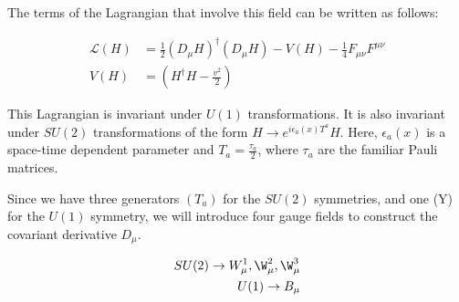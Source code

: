The terms of the Lagrangian that involve this field can be written as follows:

\begin{align*}
  \mathcal{L}(H) &= \frac{1}{2}(D_\mu H)^\dag(D_\mu H)-V(H)-\frac{1}{4}F_{\mu\nu}F^{\mu\nu}\\
  V(H) &= \left(H^\dag H-\frac{v^2}{2}\right)
\end{align*}

This Lagrangian is invariant under $U(1)$ transformations. It is also invariant under $SU(2)$ transformations of the form $H\rightarrow e^{i\epsilon_a(x)T^a}H$. Here, $\epsilon_a (x)$ is a space-time dependent parameter and $T_a = \frac{\tau_a}{2}$, where $\tau_a$ are the familiar Pauli matrices.

Since we have three generators $(T_a)$ for the $SU(2)$ symmetries, and one (Y) for the $U(1)$ symmetry, we will introduce four gauge fields to construct the covariant derivative $D_\mu$.

\begin{align*}
  SU(2)\rightarrow W_\mu^1,\W_\mu^2, \W_\mu^3\\
  U(1)\rightarrow B_\mu
\end{align*}

